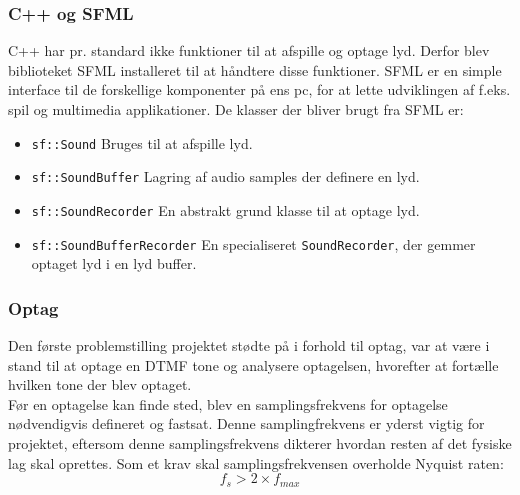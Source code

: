 \subsubsection{C++ og SFML}
C++ har pr. standard ikke funktioner til at afspille og optage lyd. Derfor blev biblioteket SFML installeret til at håndtere disse funktioner. SFML er en simple interface til de forskellige komponenter på ens pc, for at lette udviklingen af f.eks. spil og multimedia applikationer.
\newline
De klasser der bliver brugt fra SFML er:
\begin{itemize}
	\item \texttt{sf::Sound}
	\newline Bruges til at afspille lyd.
	
	\item \texttt{sf::\textcolor{dkgreen}{SoundBuffer}}
	\newline Lagring af audio samples der definere en lyd.
	
	\item \texttt{sf::\textcolor{dkgreen}{SoundRecorder}}
	\newline En abstrakt grund klasse til at optage lyd.
	
	\item \texttt{sf::\textcolor{dkgreen}{SoundBufferRecorder}}
	\newline En specialiseret \texttt{SoundRecorder}, der gemmer optaget lyd i en lyd buffer. 
\end{itemize}

\subsubsection{Optag}
Den første problemstilling projektet stødte på i forhold til optag, var at være i stand til at optage en DTMF tone og analysere optagelsen, hvorefter at fortælle hvilken tone der blev optaget.
\\
\newline
Før en optagelse kan finde sted, blev en samplingsfrekvens for optagelse nødvendigvis defineret og fastsat. Denne samplingfrekvens er yderst vigtig for projektet, eftersom denne samplingsfrekvens dikterer hvordan resten af det fysiske lag skal oprettes. 
\newline
Som et krav skal samplingsfrekvensen overholde Nyquist raten:
\begin{equation}
f_s > 2 \times f_{max}
\label{eq:samnyq}
\end{equation}

